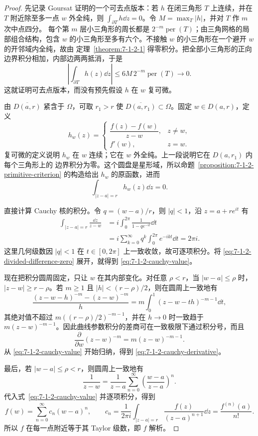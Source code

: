 \begin{proof}
先记录 Goursat 证明的一个可去点版本：若 $h$ 在闭三角形 $T$ 上连续，并在 $T$ 附近除至多一点
$w$ 外全纯，则 $\int_{\partial T}h\dd z=0$。令 $M=\max_T|h|$，并对 $T$ 作 $m$ 次中点四分。
每个第 $m$ 层小三角形的周长都是 $2^{-m}\operatorname{per}(T)$；由三角网格的局部组合结构，包含
$w$ 的小三角形至多有六个。不接触 $w$ 的小三角形在一个避开 $w$ 的开邻域内全纯，故由
定理~\ref{theorem:7-1-2-1} 得零积分。把全部小三角形的正向边界积分相加，内部边两两抵消，于是
\[
 \left|\int_{\partial T}h(z)\dd z\right|
 \leq 6M\,2^{-m}\operatorname{per}(T)\longrightarrow0.
\]
这就证明可去点版本，而没有预先假设 $h$ 在 $w$ 复可微。

由 $\overline{D(a,r)}$ 紧含于 $\Omega$，可取 $r_1>r$ 使
$\overline{D(a,r_1)}\subset\Omega$。固定 $w\in D(a,r)$，定义
\[
 h_w(z)=
 \begin{cases}
 \dfrac{f(z)-f(w)}{z-w},&z\ne w,\\[6pt]
 f'(w),&z=w.
 \end{cases}
\]
复可微的定义说明 $h_w$ 在 $w$ 连续；它在 $w$ 外全纯。上一段说明它在 $D(a,r_1)$ 内每个三角形上的
边界积分为零。这个圆盘是星形域，所以命题~\ref{proposition:7-1-2-primitive-criterion} 的构造给出
$h_w$ 的原函数，进而
\[
 \int_{|z-a|=r}h_w(z)\dd z=0.
 \tag{7.1.11}\label{eq:7-1-2-divided-difference-zero}
\]

直接计算 Cauchy 核的积分。令 $q=(w-a)/r$，则 $|q|<1$，沿
$z=a+re^{it}$ 有
\begin{align*}
 \int_{|z-a|=r}\frac{\dd z}{z-w}
 &=i\int_0^{2\pi}\frac{1}{1-qe^{-it}}\dd t\\
 &=i\sum_{k=0}^{\infty}q^k\int_0^{2\pi}e^{-ikt}\dd t
 =2\pi i.
\end{align*}
这里几何级数因 $|q|<1$ 在 $t\in[0,2\pi]$ 上一致收敛，故可逐项积分。将
\eqref{eq:7-1-2-divided-difference-zero} 展开，就得到
\eqref{eq:7-1-2-cauchy-value}。

现在把积分圆周固定，只让 $w$ 在其内部变化。对任意 $\rho<r$，当 $|w-a|\le\rho$ 时，
$|z-w|\ge r-\rho$。若 $m\ge1$ 且 $|h|<(r-\rho)/2$，则在圆周上一致地有
\[
 \frac{(z-w-h)^{-m}-(z-w)^{-m}}h
 =m\int_0^1(z-w-th)^{-m-1}\dd t,
\]
其绝对值不超过 $m((r-\rho)/2)^{-m-1}$，并在 $h\to0$ 时一致趋于
$m(z-w)^{-m-1}$。因此曲线参数积分的差商可在一致极限下通过积分号，而且
\[
 \frac{\partial}{\partial w}(z-w)^{-m}
 =m(z-w)^{-m-1}.
\]
从 \eqref{eq:7-1-2-cauchy-value} 开始归纳，得到
\eqref{eq:7-1-2-cauchy-derivative}。

最后，若 $|w-a|\le\rho<r$，则圆周上一致地有
\[
 \frac1{z-w}
 =\frac1{z-a}\sum_{n=0}^{\infty}\left(\frac{w-a}{z-a}\right)^n.
\]
代入式~\eqref{eq:7-1-2-cauchy-value} 并逐项积分，得到
\[
 f(w)=\sum_{n=0}^{\infty}c_n(w-a)^n,
 \qquad
 c_n=\frac1{2\pi i}\int_{|z-a|=r}
       \frac{f(z)}{(z-a)^{n+1}}\dd z
     =\frac{f^{(n)}(a)}{n!}.
\]
所以 $f$ 在每一点附近等于其 Taylor 级数，即 $f$ 解析。
\end{proof}

